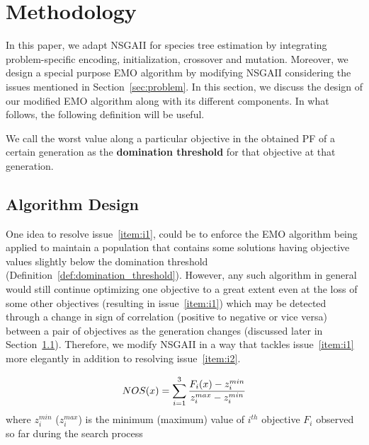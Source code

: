 \section{Methodology}
\label{sec:method}
In this paper, we adapt NSGAII for species tree estimation by integrating problem-specific encoding, initialization, crossover and mutation. Moreover, we design a special purpose EMO algorithm by modifying NSGAII considering the issues mentioned in Section~\ref{sec:problem}. In this section, we discuss the design of our modified EMO algorithm along with its different components. In what follows, the following definition will be useful. %

\begin{definition}\label{def:domination_threshold}
	\small
	We call the worst value along a particular objective in the obtained PF of a certain generation as the \textbf{domination threshold} for that objective at that generation.
\end{definition}

\subsection{Algorithm Design}
One idea to resolve issue~\ref{item:i1}, could be to enforce the EMO algorithm being applied to maintain a population that contains some solutions having objective values slightly below the domination threshold (Definition~\ref{def:domination_threshold}). However, any such algorithm in general would still
continue optimizing one objective to a great extent even at the loss of some other objectives (resulting in issue~\ref{item:i1}) which may be detected through a change in sign of correlation (positive to negative or vice versa)  between a pair of objectives as the generation changes (discussed later in Section~\ref{}). 
Therefore, we modify NSGAII in a way that tackles issue~\ref{item:i1} more elegantly in addition to resolving issue~\ref{item:i2}.  



\begin{equation}\label{eqn:nos}
\small
NOS(x) = \sum_{i=1}^{3} \frac{F_i(x)-z_i^{min}}{z_i^{max}-z_i^{min}}
\end{equation}
{\scriptsize where $z_i^{min}$ ($z_i^{max}$) is the minimum (maximum) value of $i^{th}$ objective $F_i$ observed so far during the search process}

